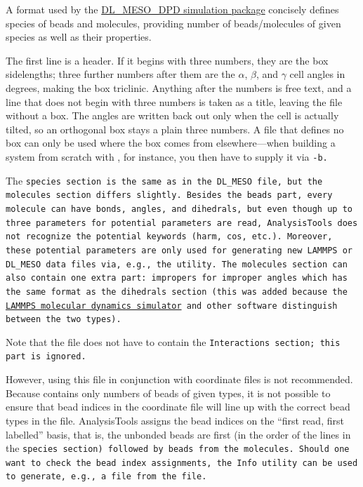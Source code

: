 A format used by the
\href{https://www.scd.stfc.ac.uk/Pages/DL_MESO.aspx}{DL_MESO_DPD simulation
package} concisely defines species of beads and molecules, providing number of
beads/molecules of given species as well as their properties.

The first line is a header. If it begins with three numbers, they are the box
sidelengths; three further numbers after them are the $\alpha$, $\beta$, and
$\gamma$ cell angles in degrees, making the box triclinic. Anything after the
numbers is free text, and a line that does not begin with three numbers is
taken as a title, leaving the file without a box. The angles are written back
out only when the cell is actually tilted, so an orthogonal box stays a plain
three numbers. A \field file that defines no box can only be used where the box
comes from elsewhere---when building a system from scratch with
, for instance, you then have to supply it via
\tt{-b}.

The \tt{species} section is the same as in the \tt{DL_MESO} \field file, but the
\tt{molecules} section differs slightly. Besides the \tt{beads} part, every
molecule can have \tt{bonds}, \tt{angles}, and \tt{dihedrals}, but even though
up to three parameters for potential parameters are read, AnalysisTools does not
recognize the potential keywords (\tt{harm}, \tt{cos}, etc.). Moreover, these
potential parameters are only used for generating new \tt{LAMMPS} or
\tt{DL_MESO} data files via, e.g., the  utility. The
\tt{molecules} section can also contain one extra part: \tt{impropers} for
improper angles which has the same format as the \tt{dihedrals} section (this
was added because the \href{https://lammps.sandia.gov/}{LAMMPS molecular
dynamics simulator} and other software distinguish between the two types).

Note that the \field file does not have to contain the \tt{Interactions}
section; this part is ignored.

However, using this file in conjunction with coordinate files is not
recommended. Because \field contains only numbers of beads of given types, it is
not possible to ensure that bead indices in the coordinate file will line up
with the correct bead types in the \field file. AnalysisTools assigns the bead
indices on the \enquote{first read, first labelled} basis, that is, the unbonded
beads are first (in the order of the lines in the \tt{species} section) followed
by beads from the molecules. Should one want to check the bead index
assignments, the \tt{Info} utility can be used to generate, e.g., a \vsf file
from the \field file.

